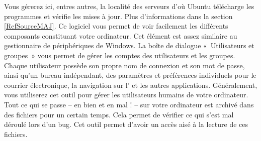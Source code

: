 Vous gérerez ici, entres autres, la localité des serveurs d'où Ubuntu télécharge les programmes et vérifie les mises à jour. Plus d'informations dans la section \ref{RefSourceMAJ}.
Ce logiciel vous permet de voir facilement les différents composants constituant votre ordinateur. Cet élément est assez similaire au gestionnaire de périphériques de Windows.
La boîte de dialogue «~Utilisateurs et groupes~» vous permet de gérer les comptes des utilisateurs et les groupes. Chaque utilisateur possède son propre nom de connexion et son mot de passe, ainsi qu'un bureau indépendant, des paramètres et préférences individuels pour le courrier électronique, la navigation sur l' et les autres applications. Généralement, vous utiliserez cet outil pour gérer les utilisateurs humains de votre ordinateur.
Tout ce qui se passe -- en bien et en mal ! -- sur votre ordinateur est archivé dans des fichiers  pour un certain temps. Cela permet de vérifier ce qui s'est mal déroulé lors d'un bug. Cet outil permet d'avoir un accès aisé à la lecture de ces fichiers.
